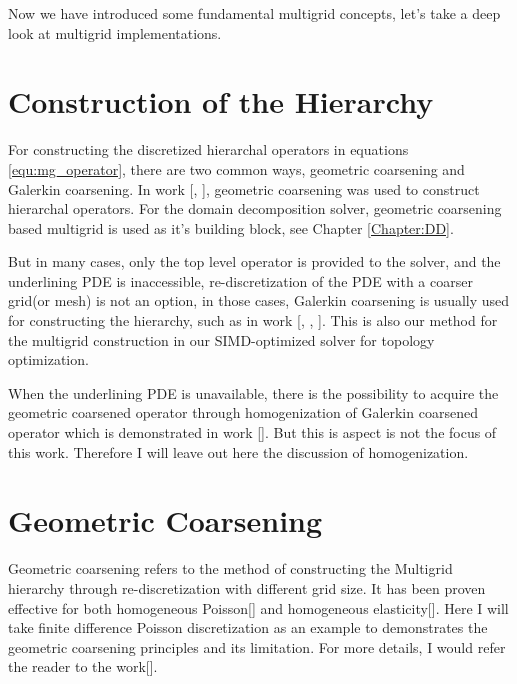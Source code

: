 Now we have introduced some fundamental multigrid concepts, let's take a deep look at multigrid implementations.
\section{Construction of the Hierarchy}
For constructing the discretized hierarchal operators in equations \ref{equ:mg_operator}, there are two common ways, geometric coarsening and Galerkin coarsening. In work [\cite{zhu2010efficient}, \cite{mcadams2010parallel}], geometric coarsening was used to construct hierarchal operators. For the domain decomposition solver, geometric coarsening based multigrid is used as it's building block, see Chapter \ref{Chapter:DD}. 

But in many cases, only the top level operator is provided to the solver, and the underlining PDE is inaccessible, re-discretization of the PDE with a coarser grid(or mesh) is not an option, in those cases, Galerkin coarsening is usually used for constructing the hierarchy, such as in work [\cite{dendy1982black}, \cite{brezina2001algebraic}, \cite{dohrmann2007interpolation}]. This is also our method for the multigrid construction in our SIMD-optimized solver for topology optimization.  

When the underlining PDE is unavailable, there is the possibility to acquire the geometric coarsened operator through homogenization of Galerkin coarsened operator which is demonstrated in work [\cite{moulton1998black}]. But this is aspect is not the focus of this work. Therefore I will leave out here the discussion of homogenization.
\section{Geometric Coarsening}
Geometric coarsening refers to the method of constructing the Multigrid hierarchy through re-discretization with different grid size. It has been proven effective for both homogeneous Poisson[\cite{mcadams2010parallel}] and homogeneous elasticity[\cite{zhu2010efficient}]. Here I will take finite difference Poisson discretization as an example to demonstrates the geometric coarsening principles and its limitation. For more details, I would refer the reader to the work[\cite{mcadams2010parallel}].

